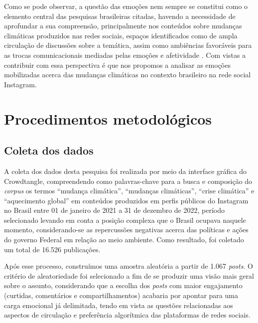 \documentclass[portuguese]{textolivre}
\begin{document}
Como se pode observar, a questão das emoções nem sempre se constitui como o elemento central das pesquisas brasileiras citadas, havendo a necessidade de aprofundar a sua compreensão, principalmente nos conteúdos sobre mudanças climáticas produzidos nas redes sociais, espaços identificados como de ampla circulação de discussões sobre a temática, assim como ambiências favoráveis para as trocas comunicacionais mediadas pelas emoções e afetividade \textcite{papacharissi2014affective,serrano2016internet}. Com vistas a contribuir com essa perspectiva é que nos propomos a analisar as emoções mobilizadas acerca das mudanças climáticas no contexto brasileiro na rede social Instagram.


\section{Procedimentos metodológicos}\label{sec-fmt-manuscrito}
\subsection{Coleta dos dados}
A coleta dos dados desta pesquisa foi realizada por meio da interface gráfica do Crowdtangle, compreendendo como palavras-chave para a busca e composição do \textit{corpus} os termos “mudança climática”, “mudanças climáticas”, “crise climática” e “aquecimento global” em conteúdos produzidos em perfis públicos do Instagram no Brasil entre 01 de janeiro de 2021 a 31 de dezembro de 2022, período selecionado levando em conta a posição complexa que o Brasil ocupava naquele momento, considerando-se as repercussões negativas acerca das políticas e ações do governo Federal em relação ao meio ambiente. Como resultado, foi coletado um total de 16.526 publicações.

Após esse processo, construímos uma amostra aleatória a partir de 1.067 \textit{posts}. O critério de aleatoriedade foi selecionado a fim de se produzir uma visão mais geral sobre o assunto, considerando que a escolha dos \textit{posts} com maior engajamento (curtidas, comentários e compartilhamentos) acabaria por apontar para uma carga emocional já delimitada, tendo em vista as questões relacionadas aos aspectos de circulação e preferência algorítmica \cite{berger2012viral} das plataformas de redes sociais.
\end{document}
